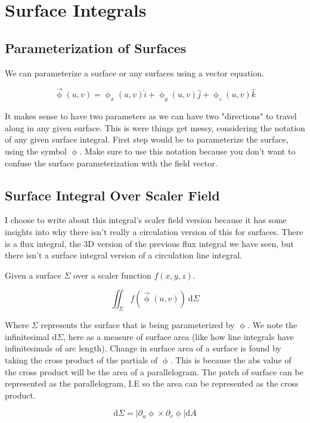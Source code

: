 \chapter{Surface Integrals}

\section{Parameterization of Surfaces}
We can parameterize a surface or any surfaces using a vector equation.

\begin{equation*}
	\vec{\upphi}(u,v) = \upphi_x(u,v)\hat{i} +\upphi_y(u,v)\hat{j}+\upphi_z(u,v)\hat{k} 
\end{equation*}

It makes sense to have two parameters as we can have two "directions" to travel along in any given surface. This is were things get messy, considering the notation of any given surface integral. First step would be to parameterize the surface, using the symbol $\upphi$. Make sure to use this notation because you don't want to confuse the surface parameterization with the field vector.

\section{Surface Integral Over Scaler Field}

I choose to write about this integral's scaler field version because it has some insights into why there isn't really a circulation version of this for surfaces. There is a flux integral, the 3D version of the previous flux integral we have seen, but there isn't a surface integral version of a circulation line integral. 

{
	Given a surface $\Sigma$ over a scaler function $f(x,y,z)$.

	\begin{equation*}
		\iint_{\Sigma} f(\vec{\upphi}(u,v)) \: \mathrm{d}\Sigma
	\end{equation*}

	Where $\Sigma$ represents the surface that is being parameterized by $\upphi$. We note the infinitesimal $\mathrm{d}\Sigma$, here as a measure of surface area (like how line integrals have infinitesimals of arc length). Change in surface area of a surface is found by taking the cross product of the partials of $\upphi$. This is because the abs value of the cross product will be the area of a parallelogram. The patch of surface can be represented as the parallelogram, I.E so the area can be represented as the cross product.

	\begin{equation*}
		\mathrm{d}\Sigma = |\partial_u\upphi \times \partial_v\upphi|\mathrm{d}A
	\end{equation*}
} 

